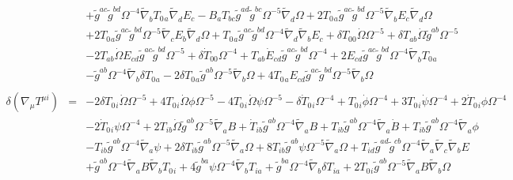 \documentclass[10pt,letterpaper]{article}
\numberwithin{equation}{section}
\begin{document}
\begin{eqnarray}
&& + \tilde{g}^{ac} \tilde{g}^{bd} \Omega^{-4} \tilde{\nabla}_{b}T_{0}{}_{a} \tilde{\nabla}_{d}E_{c} -  B_{a} T_{bc} \tilde{g}^{ad} \tilde{g}^{bc} \Omega^{-5} \tilde{\nabla}_{d}\Omega + 2 T_{0}{}_{a} \tilde{g}^{ac} \tilde{g}^{bd} \Omega^{-5} \tilde{\nabla}_{b}E_{c} \tilde{\nabla}_{d}\Omega \nonumber \\ 
&& + 2 T_{0}{}_{a} \tilde{g}^{ac} \tilde{g}^{bd} \Omega^{-5} \tilde{\nabla}_{c}E_{b} \tilde{\nabla}_{d}\Omega + T_{0}{}_{a} \tilde{g}^{ac} \tilde{g}^{bd} \Omega^{-4} \tilde{\nabla}_{d}\tilde{\nabla}_{b}E_{c}+\delta T_{00}{} \dot{\Omega} \Omega^{-5} + \delta T_{ab} \dot{\Omega} \tilde{g}^{ab} \Omega^{-5} \nonumber \\ 
&& - 2 T_{ab} \dot{\Omega} E_{cd} \tilde{g}^{ac} \tilde{g}^{bd} \Omega^{-5} + \delta \dot{T}_{00}{} \Omega^{-4} + T_{ab} \dot{E}_{cd} \tilde{g}^{ac} \tilde{g}^{bd} \Omega^{-4} + 2 E_{cd} \tilde{g}^{ac} \tilde{g}^{bd} \Omega^{-4} \tilde{\nabla}_{b}T_{0}{}_{a} \nonumber \\ 
&& -  \tilde{g}^{ab} \Omega^{-4} \tilde{\nabla}_{b}\delta T_{0}{}_{a} - 2 \delta T_{0}{}_{a} \tilde{g}^{ab} \Omega^{-5} \tilde{\nabla}_{b}\Omega + 4 T_{0}{}_{a} E_{cd} \tilde{g}^{ac} \tilde{g}^{bd} \Omega^{-5} \tilde{\nabla}_{b}\Omega 
\\  \nonumber\\ 
\delta(\nabla_\mu T^{\mu i})&=& -2 \delta T_{0}{}_{i} \dot{\Omega} \Omega^{-5} + 4 T_{0}{}_{i} \dot{\Omega} \phi \Omega^{-5} - 4 T_{0}{}_{i} \dot{\Omega} \psi \Omega^{-5} -  \delta \dot{T}_{0}{}_{i} \Omega^{-4} + T_{0}{}_{i} \dot{\phi} \Omega^{-4} + 3 T_{0}{}_{i} \dot{\psi} \Omega^{-4} + 2 \dot{T}_{0}{}_{i} \phi \Omega^{-4} \nonumber \\ 
&& - 2 \dot{T}_{0}{}_{i} \psi \Omega^{-4} + 2 T_{ib} \dot{\Omega} \tilde{g}^{ab} \Omega^{-5} \tilde{\nabla}_{a}B + \dot{T}_{ib} \tilde{g}^{ab} \Omega^{-4} \tilde{\nabla}_{a}B + T_{ib} \tilde{g}^{ab} \Omega^{-4} \tilde{\nabla}_{a}\dot{B} + T_{ib} \tilde{g}^{ab} \Omega^{-4} \tilde{\nabla}_{a}\phi \nonumber \\ 
&& -  T_{ib} \tilde{g}^{ab} \Omega^{-4} \tilde{\nabla}_{a}\psi + 2 \delta T_{ib} \tilde{g}^{ab} \Omega^{-5} \tilde{\nabla}_{a}\Omega + 8 T_{ib} \tilde{g}^{ab} \psi \Omega^{-5} \tilde{\nabla}_{a}\Omega + T_{id} \tilde{g}^{ad} \tilde{g}^{cb} \Omega^{-4} \tilde{\nabla}_{a}\tilde{\nabla}_{c}\tilde{\nabla}_{b}E \nonumber \\ 
&& + \tilde{g}^{ab} \Omega^{-4} \tilde{\nabla}_{a}B \tilde{\nabla}_{b}T_{0}{}_{i} + 4 \tilde{g}^{ba} \psi \Omega^{-4} \tilde{\nabla}_{b}T_{ia} + \tilde{g}^{ba} \Omega^{-4} \tilde{\nabla}_{b}\delta T_{ia} + 2 T_{0}{}_{i} \tilde{g}^{ab} \Omega^{-5} \tilde{\nabla}_{a}B \tilde{\nabla}_{b}\Omega \nonumber \\ 

\end{eqnarray}
\end{document}
